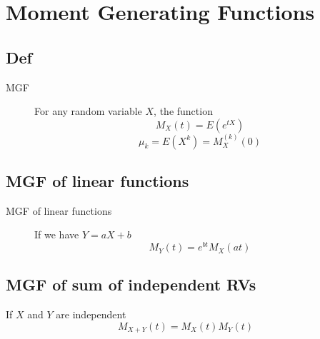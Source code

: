 \section{Moment Generating Functions}
\subsection*{Def}
\begin{description}
    \item[MGF] For any random variable $X$, the function
    \[ M_X(t) = E(e^{tX}) \]
    \[\mu_k = E(X^k) = M_X^{(k)}(0)\]
\end{description}
\subsection*{MGF of linear functions}
    \begin{description}
        \item[MGF of linear functions] If we have $Y = aX + b$
        \[M_Y(t) = e^{bt}M_X(at)\]
    \end{description}

\subsection*{MGF of sum of independent RVs}
    \begin{description}
        \item If $X$ and $Y$ are independent
        \[M_{X+Y}(t) = M_X(t)M_Y(t)\]
    \end{description}